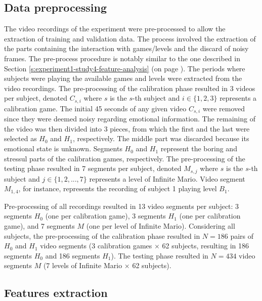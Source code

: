 \subsection{Data preprocessing}

The video recordings of the experiment were pre-processed to allow the extraction of training and validation data. The process involved the extraction of the parts containing the interaction with games/levels and the discard of noisy frames. The pre-process procedure is notably similar to the one described in Section \ref{s:experiment1-study4-feature-analysis} (on page \pageref{s:experiment1-study4-feature-analysis}). The periods where subjects were playing the available games and levels were extracted from the video recordings. The pre-processing of the calibration phase resulted in 3 videos per subject, denoted $C_{s,i}$ where $s$ is the $s$-th subject and $i \in \{1, 2, 3\}$ represents a calibration game. The initial 45 seconds of any given video $C_{s,i}$ were removed since they were deemed noisy regarding emotional information. The remaining of the video was then divided into 3 pieces, from which the first and the last were selected as $H_0$ and $H_1$, respectively. The middle part was discarded because its emotional state is unknown. Segments $H_0$ and $H_1$ represent the boring and stressul parts of the calibration games, respectively. The pre-processing of the testing phase resulted in 7 segments per subject, denoted $M_{s,j}$ where $s$ is the $s$-th subject and $j \in \{1, 2, ..., 7\}$ represents a level of Infinite Mario. Video segment $M_{1,4}$, for instance, represents the recording of subject 1 playing level $B_1$.

Pre-processing of all recordings resulted in 13 video segments per subject: 3 segments $H_0$ (one per calibration game), 3 segments $H_1$ (one per calibration game), and 7 segments $M$ (one per level of Infinite Mario). Considering all subjects, the pre-processing of the calibration phase resulted in $N=186$ pairs of $H_0$ and $H_1$ video segments (3 calibration games $\times$ 62 subjects, resulting in 186 segments $H_0$ and 186 segments $H_1$). The testing phase resulted in $N=434$ video segments $M$ (7 levels of Infinite Mario $\times$ 62 subjects).

\subsection{Features extraction}

